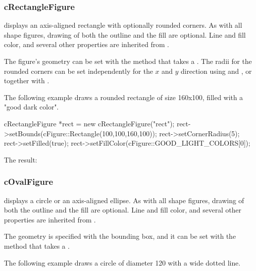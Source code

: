 \subsubsection{cRectangleFigure}
\label{sec:graphics:rectanglefigure}

 displays an axis-aligned rectangle with
optionally rounded corners. As with all shape figures, drawing of both the
outline and the fill are optional. Line and fill color, and several other
properties are inherited from .

The figure's geometry can be set with the  method that
takes a . The radii for the rounded corners can
be set independently for the $x$ and $y$ direction using
 and , or together with
.

The following example draws a rounded rectangle of size 160x100, filled with
a "good dark color".

\begin{cpp}
cRectangleFigure *rect = new cRectangleFigure("rect");
rect->setBounds(cFigure::Rectangle(100,100,160,100));
rect->setCornerRadius(5);
rect->setFilled(true);
rect->setFillColor(cFigure::GOOD_LIGHT_COLORS[0]);
\end{cpp}


The result:

\begin{center}

\end{center}


\subsubsection{cOvalFigure}
\label{sec:graphics:ovalfigure}

 displays a circle or an axis-aligned ellipse. As with
all shape figures, drawing of both the outline and the fill are optional.
Line and fill color, and several other properties are inherited from
.

The geometry is specified with the bounding box, and it can be set with the
 method that takes a .

The following example draws a circle of diameter 120 with a wide dotted line.

